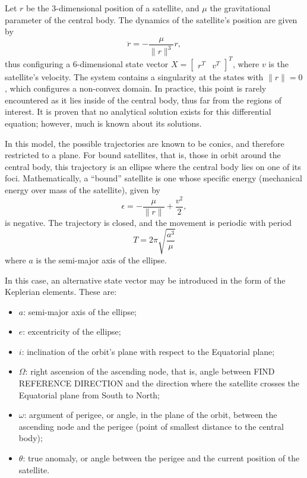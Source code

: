 Let \(r\) be the 3-dimensional position of a satellite, and \(\mu \) the gravitational parameter of the central body. The dynamics of the satellite's position are given by
\begin{equation}
    \ddot{r} = -\frac{\mu}{\lVert r \rVert^3} r,
\end{equation}
thus configuring a 6-dimensional state vector \(X = \begin{bmatrix}
    r^T & v^T
\end{bmatrix}^T\), where \(v\) is the satellite's velocity. The system contains a singularity at the states with \(\lVert r \rVert = 0\), which configures a non-convex domain. In practice, this point is rarely encountered as it lies inside of the central body, thus far from the regions of interest. It is proven that no analytical solution exists for this differential equation; however, much is known about its solutions.

In this model, the possible trajectories are known to be conics, and therefore restricted to a plane. For bound satellites, that is, those in orbit around the central body, this trajectory is an ellipse where the central body lies on one of its foci. Mathematically, a ``bound'' satellite is one whose specific energy (mechanical energy over mass of the satellite), given by
\begin{equation}
    \epsilon = -\frac{\mu}{\lVert r \rVert} + \frac{v^2}{2},
\end{equation}
is negative. The trajectory is closed, and the movement is periodic with period
\begin{equation}
    T = 2\pi \sqrt{\frac{a^3}{\mu}}
\end{equation}
where \(a\) is the semi-major axis of the ellipse.

In this case, an alternative state vector may be introduced in the form of the Keplerian elements. These are:
\begin{itemize}
    \item \(a\): semi-major axis of the ellipse;
    \item \(e\): excentricity of the ellipse;
    \item \(i\): inclination of the orbit's plane with respect to the Equatorial plane;
    \item \(\Omega \): right ascension of the ascending node, that is, angle between FIND REFERENCE DIRECTION and the direction where the satellite crosses the Equatorial plane from South to North;
    \item \(\omega \): argument of perigee, or angle, in the plane of the orbit, between the ascending node and the perigee (point of smallest distance to the central body);
    \item \(\theta \): true anomaly, or angle between the perigee and the current position of the satellite.
\end{itemize}

